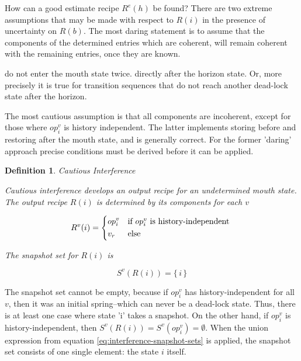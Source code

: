 \documentclass[12pt,a4paper]{scrartcl}
\newtheorem{definition}{Definition}
\begin{document}
How can a good estimate recipe $R^e(h)$ be found?  There are two extreme
assumptions that may be made with respect to $R(i)$ in the presence of
uncertainty on $R(b)$. The most daring statement is to assume that the
components of the determined entries which are coherent, will remain coherent
with the remaining entries, once they are known. 

do not enter the mouth state twice. directly after the horizon state. Or, more precisely it is true for
transition sequences that do not reach another dead-lock state after the
horizon.


The most cautious assumption is that all components are
incoherent, except for those where $op^v_i$ is history independent. The latter
implements storing before and restoring after the mouth state, and is generally
correct.  For the former 'daring' approach precise conditions must be derived
before it can be applied.


\begin{definition} Cautious Interference

Cautious interference develops an output recipe for an undetermined mouth
state. The output recipe $R(i)$ is determined by its components for each $v$
          
\begin{equation} \label{eq:cautious-output-recipe}
    R^v(i) = \begin{dcases*}
              op^v_i & if $op^v_i$ is history-independent \\
              v_r    & else
             \end{dcases*}
\end{equation}

The snapshot set for $R(i)$ is

\begin{equation} \label{eq:cautious-interference-snapshot}
    S^v(R(i)) = \{ \, i \, \}
\end{equation}

\end{definition}

The snapshot set cannot be empty, because if $op^v_i$ has history-independent
for all $v$, then it was an initial spring--which can never be a dead-lock
state.  Thus, there is at least one case where state 'i' takes a snapshot. On
the other hand, if $op^v_i$ is history-independent, then
$S^v(R(i))=S^v(op^v_i)=\emptyset$. When the union expression from equation
\eqref{eq:interference-snapshot-sets} is applied, the snapshot set consists of
one single element: the state $i$ itself. 
\end{document}
